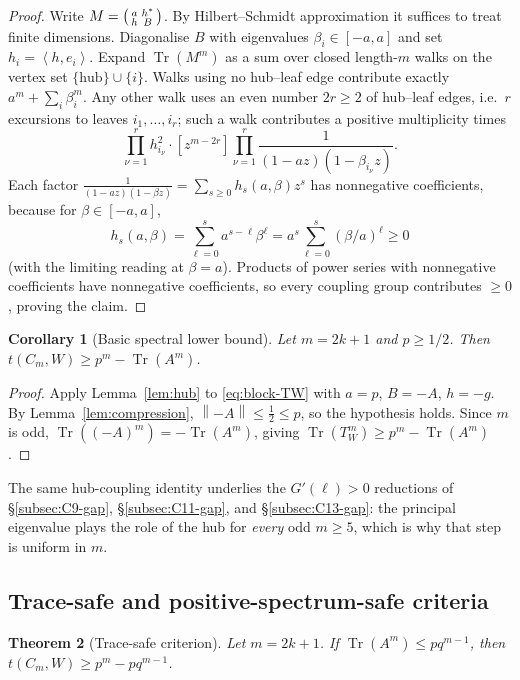 \documentclass[11pt]{article}
\newtheorem{theorem}{Theorem}[section]
\newtheorem{corollary}[theorem]{Corollary}
\newcommand{\ip}[2]{\left\langle #1,#2\right\rangle}
\newcommand{\Tr}{\operatorname{Tr}}
\newcommand{\norm}[1]{\left\|#1\right\|}
\begin{document}
\begin{proof}
Write $M=\begin{psmallmatrix} a & h^*\\ h & B\end{psmallmatrix}$.  By Hilbert--Schmidt approximation it suffices to treat finite dimensions.  Diagonalise $B$ with eigenvalues $\beta_i\in[-a,a]$ and set $h_i=\ip{h}{e_i}$.  Expand $\Tr(M^m)$ as a sum over closed length-$m$ walks on the vertex set $\{\text{hub}\}\cup\{i\}$.  Walks using no hub--leaf edge contribute exactly $a^m+\sum_i\beta_i^m$.  Any other walk uses an even number $2r\ge2$ of hub--leaf edges, i.e.\ $r$ excursions to leaves $i_1,\ldots,i_r$; such a walk contributes a positive multiplicity times
\[
        \prod_{\nu=1}^r h_{i_\nu}^2\cdot[z^{m-2r}]\prod_{\nu=1}^r\frac1{(1-az)(1-\beta_{i_\nu}z)}.
\]
Each factor $\frac1{(1-az)(1-\beta z)}=\sum_{s\ge0}h_s(a,\beta)z^s$ has nonnegative coefficients, because for $\beta\in[-a,a]$,
\[
        h_s(a,\beta)=\sum_{\ell=0}^s a^{s-\ell}\beta^\ell=a^s\sum_{\ell=0}^s(\beta/a)^\ell\ge0
\]
(with the limiting reading at $\beta=a$).  Products of power series with nonnegative coefficients have nonnegative coefficients, so every coupling group contributes $\ge0$, proving the claim.
\end{proof}

\begin{corollary}[Basic spectral lower bound]\label{cor:basic-lower}
Let $m=2k+1$ and $p\ge1/2$.  Then $t(C_m,W)\ge p^m-\Tr(A^m)$.
\end{corollary}

\begin{proof}
Apply Lemma~\ref{lem:hub} to \eqref{eq:block-TW} with $a=p$, $B=-A$, $h=-g$.  By Lemma~\ref{lem:compression}, $\norm{-A}\le\tfrac12\le p$, so the hypothesis holds.  Since $m$ is odd, $\Tr((-A)^m)=-\Tr(A^m)$, giving $\Tr(T_W^m)\ge p^m-\Tr(A^m)$.
\end{proof}

The same hub-coupling identity underlies the $G'(\ell)>0$ reductions of \S\ref{subsec:C9-gap}, \S\ref{subsec:C11-gap}, and \S\ref{subsec:C13-gap}: the principal eigenvalue plays the role of the hub for \emph{every} odd $m\ge5$, which is why that step is uniform in $m$.

\subsection{Trace-safe and positive-spectrum-safe criteria}

\begin{theorem}[Trace-safe criterion]\label{thm:trace-safe}
Let $m=2k+1$.  If $\Tr(A^m)\le pq^{m-1}$, then $t(C_m,W)\ge p^m-pq^{m-1}$.
\end{theorem}
\end{document}
